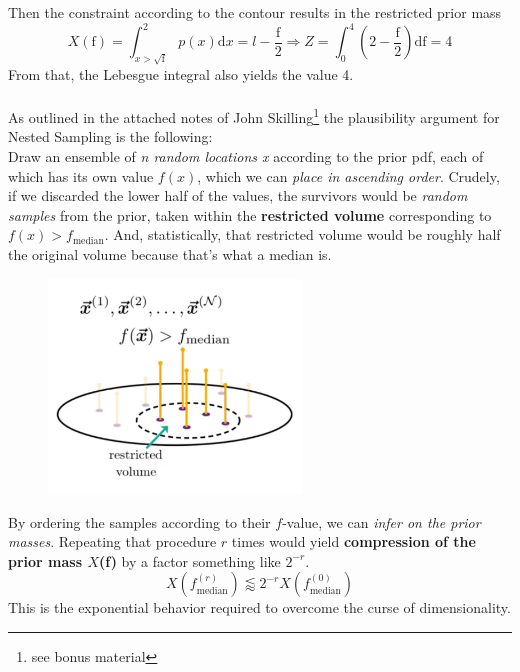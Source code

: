 \documentclass[12pt, a4paper]{scrartcl}
\begin{document}
Then the constraint according to the contour results in the restricted prior mass
\[X(\text{f})=\int_{x>\sqrt{\text{f}}}^2p(x)\text{d}x=l-\frac{\text{f}}{2} \Rightarrow Z=\int_0^4\left(2-\frac{\text{f}}{2} \right)\text{df}=4\]
From that, the Lebesgue integral also yields the value 4.\\

\\

As outlined in the attached notes of John Skilling\footnote{see bonus material} the plausibility argument
for Nested Sampling is the following:\\
 Draw an ensemble of \textit{n random locations
x} according to the prior pdf, each of which has its own value $f(x)$, which we
can \textit{place in ascending order}. Crudely, if we discarded the lower half of the
values, the survivors would be \textit{random samples} from the prior, taken within
the \textbf{restricted volume} corresponding to $f(x) > f_{\text{median}}$. And, statistically,
that restricted volume would be roughly half the original volume because
that’s what a median is.%
 \begin{figure}[H]
	\centering
	\includegraphics[width=0.6\textwidth]{9_7.png}
\end{figure}
By ordering the samples according to their $f$-value, we can \textit{infer on the prior masses}. Repeating that procedure $r$ times would yield  \textbf{compression of the prior mass $X$(f)} by a factor something like $2^{-r}$. 
\[X(f_{\text{median}}^{(r)})\lessapprox 2^{-r}X(f_{\text{median}}^{(0)})\]
This is the exponential behavior required to overcome the curse of dimensionality.\\
\end{document}
